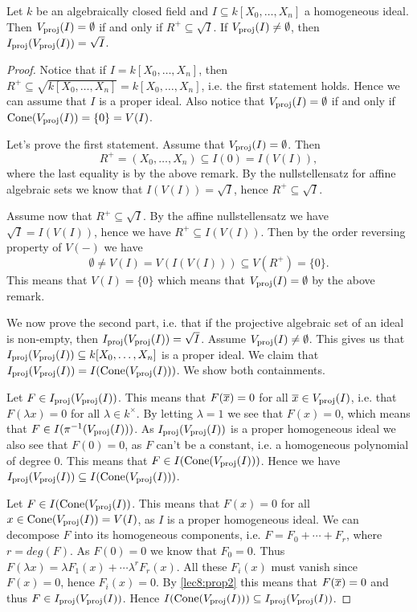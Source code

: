 \begin{theorem}
Let $k$ be an algebraically closed field and $I\subseteq k[X_0, \ldots, X_n]$ a homogeneous ideal. Then $V_{\text{proj}}(I)=\emptyset$ if and only if $R^+\subseteq \sqrt{I}$. If $V_{\text{proj}}(I)\neq \emptyset$, then $I_{\text{proj}}(V_{\text{proj}}(I))=\sqrt{I}$. 
\end{theorem}
\begin{proof}
Notice that if $I=k[X_0, \ldots, X_n]$, then $R^+\subseteq\sqrt{k[X_0, \ldots, X_n]}=k[X_0, \ldots, X_n]$, i.e. the first statement holds. Hence we can assume that $I$ is a proper ideal. Also notice that $V_{\text{proj}}(I)=\emptyset$ if and only if $\operatorname{Cone}(V_{\text{proj}}(I))=\{0\}=V(I)$.

Let's prove the first statement. Assume that $V_{\text{proj}}(I)=\emptyset$. Then 
\begin{equation*}
    R^+=(X_0, \ldots, X_n)\subseteq I(0)=I(V(I)),
\end{equation*}
where the last equality is by the above remark. By the nullstellensatz for affine algebraic sets we know that $I(V(I))=\sqrt{I}$, hence $R^+\subseteq \sqrt{I}$. 

Assume now that $R^+\subseteq \sqrt{I}$. By the affine nullstellensatz we have $\sqrt{I}=I(V(I))$, hence we have $R^+\subseteq I(V(I))$. Then by the order reversing property of $V(-)$ we have
\begin{equation*}
    \emptyset \neq V(I) = V(I(V(I))) \subseteq V(R^+)=\{0\}.
\end{equation*}
This means that $V(I)=\{0\}$ which means that $V_{\text{proj}}(I)=\emptyset$ by the above remark.

We now prove the second part, i.e. that if the projective algebraic set of an ideal is non-empty, then $I_{\text{proj}}(V_{\text{proj}}(I))=\sqrt{I}$. Assume $V_{\text{proj}}(I)\neq \emptyset$. This gives us that $I_{\text{proj}}(V_{\text{proj}}(I))\subseteq k[X_0, \ldots, X_n]$ is a proper ideal. We claim that $I_{\text{proj}}(V_{\text{proj}}(I))=I(\operatorname{Cone}(V_{\text{proj}}(I)))$. We show both containments. 

Let $F\in I_{\text{proj}}(V_{\text{proj}}(I))$. This means that $F(\overline{x})=0$ for all $\overline{x}\in V_{\text{proj}}(I)$, i.e. that $F(\lambda x)=0$ for all $\lambda\in k^\times$. By letting $\lambda=1$ we see that $F(x)=0$, which means that $F\in I(\pi^{-1}(V_{\text{proj}}(I)))$. As $I_{\text{proj}}(V_{\text{proj}}(I))$ is a proper homogeneous ideal we also see that $F(0)=0$, as $F$ can't be a constant, i.e. a homogeneous polynomial of degree 0. This means that $F\in I(\operatorname{Cone}(V_{\text{proj}}(I)))$. Hence we have $I_{\text{proj}}(V_{\text{proj}}(I))\subseteq I(\operatorname{Cone}(V_{\text{proj}}(I)))$. 

Let $F\in I(\operatorname{Cone}(V_{\text{proj}}(I))$. This means that $F(x)=0$ for all $x\in \operatorname{Cone}(V_{\text{proj}}(I)) = V(I)$, as $I$ is a proper homogeneous ideal. We can decompose $F$ into its homogeneous components, i.e. $F=F_0+\cdots+F_r$, where $r=deg(F)$. As $F(0)=0$ we know that $F_0=0$. Thus $F(\lambda x)=\lambda F_1(x)+\cdots \lambda^r F_r(x)$. All these $F_i(x)$ must vanish since $F(x)=0$, hence $F_i(x)=0$. By \ref{lec8:prop2} this means that $F(\overline{x})=0$ and thus $F\in I_{\text{proj}}(V_{\text{proj}}(I))$. Hence $I(\operatorname{Cone}(V_{\text{proj}}(I)))\subseteq I_{\text{proj}}(V_{\text{proj}}(I))$.


\end{proof}
